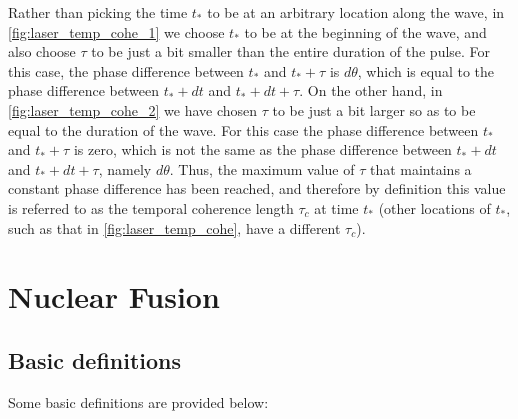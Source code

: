 \documentclass[a4paper,11pt]{report}
\begin{document}
Rather than picking the time $t_*$ to be at an arbitrary location along the wave, in \cref{fig:laser_temp_cohe_1} we choose $t_*$ to be at the beginning of the wave, and also choose $\tau$ to be just a bit smaller than the entire duration of the pulse. For this case, the phase difference between $t_*$ and $t_*+\tau$ is $d\theta$, which is equal to the phase difference between $t_*+dt$ and $t_*+dt+\tau$. On the other hand, in \cref{fig:laser_temp_cohe_2} we have chosen $\tau$ to be just a bit larger so as to be equal to the duration of the wave. For this case the phase difference between $t_*$ and $t_*+\tau$ is zero, which is not the same as the phase difference between $t_*+dt$ and $t_*+dt+\tau$, namely $d\theta$. Thus, the maximum value of $\tau$ that maintains a constant phase difference has been reached, and therefore by definition this value is referred to as the temporal coherence length $\tau_c$ at time $t_*$ (other locations of $t_*$, such as that in \cref{fig:laser_temp_cohe}, have a different $\tau_c$).

\chapter{Nuclear Fusion}

\section{Basic definitions}
Some basic definitions are provided below:
\end{document}

